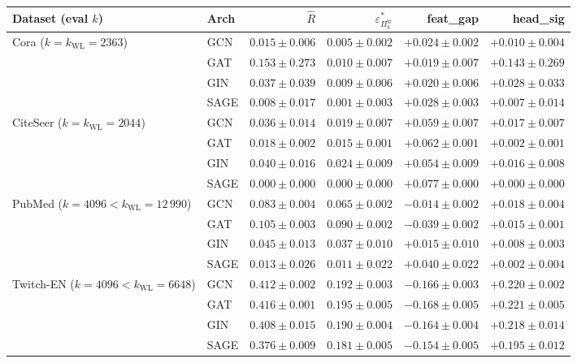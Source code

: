 \documentclass[10pt]{article}
\theoremstyle{definition}
\theoremstyle{remark}
\newcommand{\eps}{\varepsilon}
\begin{document}
\begin{table}[h]\centering\small
\begin{tabular}{llrrrr}
\toprule
Dataset (eval $k$) & Arch & $\hat R$ & $\eps^{*}_{\Pi^{\mathrm{tr}}_{k}}$ & feat\_gap & head\_sig \\
\midrule
Cora ($k{=}k_{\mathrm{WL}}{=}2363$)
 & GCN  & $0.015{\pm}0.006$ & $0.005{\pm}0.002$ & $+0.024{\pm}0.002$ & $+0.010{\pm}0.004$ \\
 & GAT  & $0.153{\pm}0.273$ & $0.010{\pm}0.007$ & $+0.019{\pm}0.007$ & $+0.143{\pm}0.269$ \\
 & GIN  & $0.037{\pm}0.039$ & $0.009{\pm}0.006$ & $+0.020{\pm}0.006$ & $+0.028{\pm}0.033$ \\
 & SAGE & $0.008{\pm}0.017$ & $0.001{\pm}0.003$ & $+0.028{\pm}0.003$ & $+0.007{\pm}0.014$ \\
\midrule
CiteSeer ($k{=}k_{\mathrm{WL}}{=}2044$)
 & GCN  & $0.036{\pm}0.014$ & $0.019{\pm}0.007$ & $+0.059{\pm}0.007$ & $+0.017{\pm}0.007$ \\
 & GAT  & $0.018{\pm}0.002$ & $0.015{\pm}0.001$ & $+0.062{\pm}0.001$ & $+0.002{\pm}0.001$ \\
 & GIN  & $0.040{\pm}0.016$ & $0.024{\pm}0.009$ & $+0.054{\pm}0.009$ & $+0.016{\pm}0.008$ \\
 & SAGE & $\mathbf{0.000{\pm}0.000}$ & $0.000{\pm}0.000$ & $\mathbf{+0.077{\pm}0.000}$ & $+0.000{\pm}0.000$ \\
\midrule
PubMed ($k{=}4096{<}k_{\mathrm{WL}}{=}12\,990$)
 & GCN  & $0.083{\pm}0.004$ & $0.065{\pm}0.002$ & $\mathbf{-0.014{\pm}0.002}$ & $+0.018{\pm}0.004$ \\
 & GAT  & $0.105{\pm}0.003$ & $0.090{\pm}0.002$ & $\mathbf{-0.039{\pm}0.002}$ & $+0.015{\pm}0.001$ \\
 & GIN  & $0.045{\pm}0.013$ & $0.037{\pm}0.010$ & $+0.015{\pm}0.010$ & $+0.008{\pm}0.003$ \\
 & SAGE & $0.013{\pm}0.026$ & $0.011{\pm}0.022$ & $+0.040{\pm}0.022$ & $+0.002{\pm}0.004$ \\
\midrule
Twitch-EN ($k{=}4096{<}k_{\mathrm{WL}}{=}6648$)
 & GCN  & $0.412{\pm}0.002$ & $0.192{\pm}0.003$ & $\mathbf{-0.166{\pm}0.003}$ & $+0.220{\pm}0.002$ \\
 & GAT  & $0.416{\pm}0.001$ & $0.195{\pm}0.005$ & $\mathbf{-0.168{\pm}0.005}$ & $+0.221{\pm}0.005$ \\
 & GIN  & $0.408{\pm}0.015$ & $0.190{\pm}0.004$ & $\mathbf{-0.164{\pm}0.004}$ & $+0.218{\pm}0.014$ \\
 & SAGE & $0.376{\pm}0.009$ & $0.181{\pm}0.005$ & $\mathbf{-0.154{\pm}0.005}$ & $+0.195{\pm}0.012$ \\

\end{tabular}
\end{table}
\end{document}
